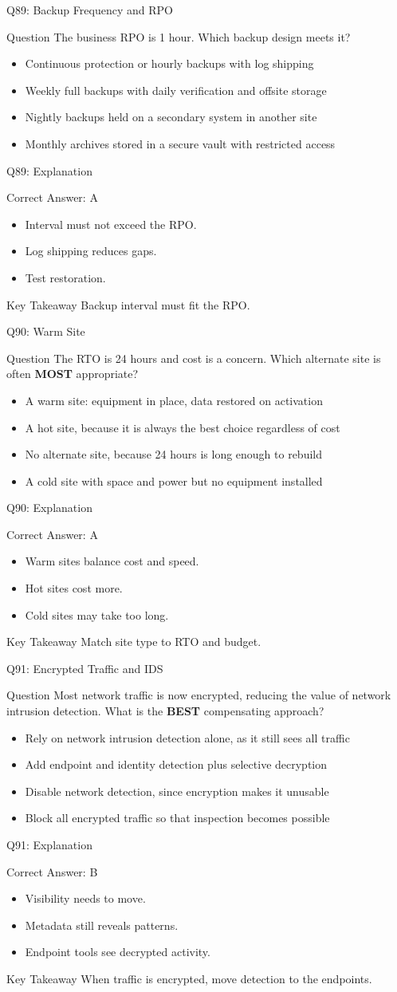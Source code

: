 \documentclass[aspectratio=169]{beamer}
\newcommand{\hq}[7]{%
	\begin{frame}{Q#1: #2}
		\begin{block}{Question}
			#3
		\end{block}
		\begin{itemize}
			#4
		\end{itemize}
	\end{frame}
	\begin{frame}{Q#1: Explanation}
		\begin{block}{Correct Answer: #5}
			\begin{itemize}
				#6
			\end{itemize}
		\end{block}
		\begin{alertblock}{Key Takeaway}
			#7
		\end{alertblock}
	\end{frame}
}
\begin{document}
	\hq{89}{Backup Frequency and RPO}
	{The business RPO is 1 hour. Which backup design meets it?}
	{\item[\textbf{(A)}] Continuous protection or hourly backups with log shipping
		\item[\textbf{(B)}] Weekly full backups with daily verification and offsite storage
		\item[\textbf{(C)}] Nightly backups held on a secondary system in another site
		\item[\textbf{(D)}] Monthly archives stored in a secure vault with restricted access}
	{A}
	{\item Interval must not exceed the RPO.
		\item Log shipping reduces gaps.
		\item Test restoration.}
	{Backup interval must fit the RPO.}

	\hq{90}{Warm Site}
	{The RTO is 24 hours and cost is a concern. Which alternate site is often \textbf{MOST} appropriate?}
	{\item[\textbf{(A)}] A warm site: equipment in place, data restored on activation
		\item[\textbf{(B)}] A hot site, because it is always the best choice regardless of cost
		\item[\textbf{(C)}] No alternate site, because 24 hours is long enough to rebuild
		\item[\textbf{(D)}] A cold site with space and power but no equipment installed}
	{A}
	{\item Warm sites balance cost and speed.
		\item Hot sites cost more.
		\item Cold sites may take too long.}
	{Match site type to RTO and budget.}

	\hq{91}{Encrypted Traffic and IDS}
	{Most network traffic is now encrypted, reducing the value of network intrusion detection. What is the \textbf{BEST} compensating approach?}
	{\item[\textbf{(A)}] Rely on network intrusion detection alone, as it still sees all traffic
		\item[\textbf{(B)}] Add endpoint and identity detection plus selective decryption
		\item[\textbf{(C)}] Disable network detection, since encryption makes it unusable
		\item[\textbf{(D)}] Block all encrypted traffic so that inspection becomes possible}
	{B}
	{\item Visibility needs to move.
		\item Metadata still reveals patterns.
		\item Endpoint tools see decrypted activity.}
	{When traffic is encrypted, move detection to the endpoints.}
\end{document}
